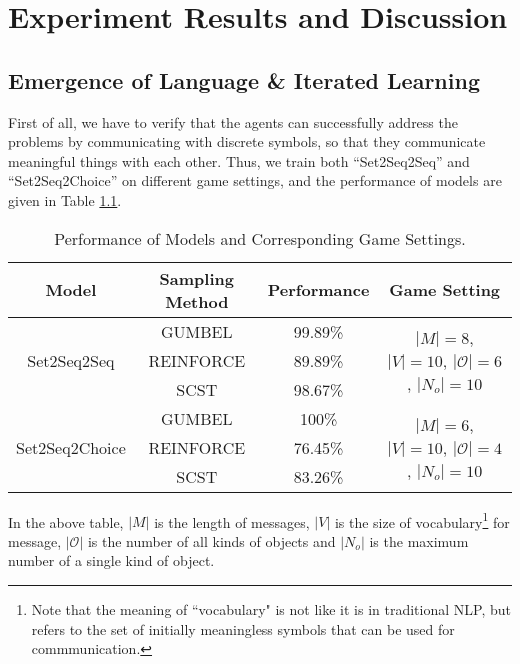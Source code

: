 \chapter{Experiment Results and Discussion}
\label{ch4:results_analysis}

\section{Emergence of Language \& Iterated Learning}
\label{sec4.1:emergence_il}

First of all, we have to verify that the agents can successfully address the problems by communicating with discrete symbols, so that they communicate meaningful things with each other. Thus, we train both ``Set2Seq2Seq'' and ``Set2Seq2Choice'' on different game settings, and the performance of models are given in Table \ref{tab4.1:game_performance}.

\begin{table}[!h]
    \centering
    \begin{tabular}{|c|c|c|c|}
        \hline
        Model                           & Sampling Method & Performance & Game Setting      \\ \hline
        \multirow{3}{*}{Set2Seq2Seq}    & GUMBEL          & 99.89\%     & \multirow{3}{1.5in}{$|M|=8$, $|V|=10$, $|\mathcal{O}|=6$, $|N_{o}|=10$} \\ \cline{2-3}
                                        & REINFORCE       & 89.89\%     &                   \\ \cline{2-3}
                                        & SCST            & 98.67\%     &                   \\ \hline
        \multirow{3}{*}{Set2Seq2Choice} & GUMBEL          & 100\%       & \multirow{3}{1.5in}{$|M|=6$, $|V|=10$, $|\mathcal{O}|=4$, $|N_{o}|=10$} \\ \cline{2-3}
                                        & REINFORCE       & 76.45\%     &                   \\ \cline{2-3}
                                        & SCST            & 83.26\%     &                   \\ \hline
        \end{tabular}
    \caption{Performance of Models and Corresponding Game Settings.}
    \label{tab4.1:game_performance}
\end{table}

In the above table, $|M|$ is the length of messages, $|V|$ is the size of vocabulary\footnote{Note that the meaning of ``vocabulary" is not like it is in traditional NLP, but refers to the set of initially meaningless symbols that can be used for commmunication.} for message, $|\mathcal{O}|$ is the number of all kinds of objects and $|N_o|$ is the maximum number of a single kind of object.


